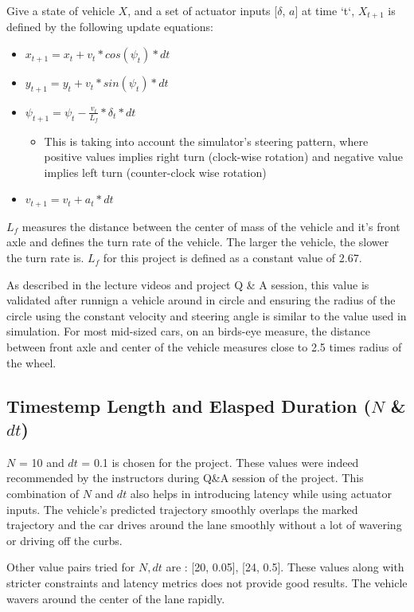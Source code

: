 \documentclass[12pt]{article}
\begin{document}
Give a state of vehicle $X$, and a set of actuator inputs [$\delta$, $a$] at time `t`, $X_{t+1}$   is defined by the following update equations: 
\begin{itemize}
  \item $x_{t+1} = x_{t} + v_{t} * cos(\psi_{t}) * dt$
  \item $y_{t+1} = y_{t} + v_{t} * sin(\psi_{t}) * dt$
  \item $\psi_{t+1} = \psi_{t } - \frac{v_{t}}{L_{f}} * \delta_{t} * dt$
    \begin{itemize} 
      \item This is taking into account the simulator's steering pattern, where positive values implies right turn (clock-wise rotation) and negative value implies left turn (counter-clock wise rotation) 
   \end{itemize}
  \item $v_{t+1} = v_{t} + a_{t} * dt$
\end{itemize}

$L_{f}$ measures the distance between the center of mass of the vehicle and it's front axle and defines the turn rate of the vehicle. The larger the vehicle, the slower the turn rate is. $L_{f}$  for this project is defined as a constant value of 2.67. 

As described in the lecture videos and project Q \& A session, this value is validated after runnign a vehicle around in circle and ensuring the radius of the circle using the constant velocity and steering angle is similar to the value used in simulation. For most mid-sized cars, on an birds-eye measure, the distance between front axle and center of the vehicle measures close to 2.5 times radius of the wheel. 

\subsection{Timestemp Length and Elasped Duration ($N$ \& $dt$)}
$N$ = 10 and $dt$ = 0.1 is chosen for the project. These values were indeed recommended by the instructors during Q\&A session of the project. This combination of $N$ and $dt$ also helps in introducing latency while using actuator inputs. The vehicle's predicted trajectory smoothly overlaps the marked trajectory and the car drives around the lane smoothly without a lot of wavering or driving off the curbs. 

Other value pairs tried for $N, dt$ are : [20, 0.05], [24, 0.5]. These values along with stricter constraints and latency metrics does not provide good results. The vehicle wavers around the center of the lane rapidly. 
\end{document}
